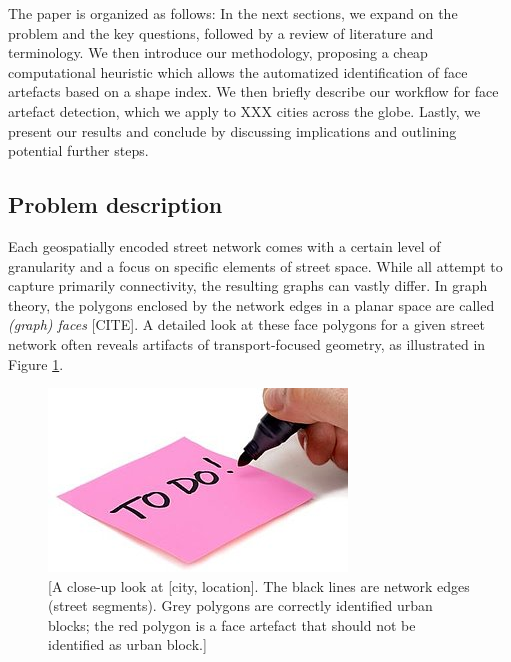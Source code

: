 The paper is organized as follows: In the next sections, we expand on the problem and
the key questions, followed by a review of literature and terminology. We then introduce
our methodology, proposing a cheap computational heuristic which allows the automatized
identification of face artefacts based on a shape index. We then briefly describe our
workflow for face artefact detection, which we apply to XXX cities across the globe.
Lastly, we present our results and conclude by discussing implications and outlining
potential further steps.




\subsection*{Problem description}
Each geospatially encoded street network comes with a certain level of granularity and a
focus on specific elements of street space. While all attempt to capture primarily
connectivity, the resulting graphs can vastly differ. In graph theory, the polygons
enclosed by the network edges in a planar space are called \textit{(graph) faces}
[CITE]. A detailed look at these face polygons for a given street network often reveals
artifacts of transport-focused geometry, as illustrated in Figure \ref{fig:01}.

\begin{figure}
    \centering
    \includegraphics{figures/todop}
    \caption{[A close-up look at [city, location]. The black lines are network edges (street segments). Grey polygons are correctly identified urban blocks; the red polygon is a face artefact that should not be identified as urban block.]}
    \label{fig:01}
\end{figure}

